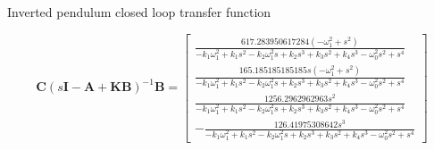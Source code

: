 \documentclass{article}
\begin{document}
Inverted pendulum closed loop transfer function

\begin{equation}
  \mathbf{C} (s\mathbf{I} - \mathbf{A} + \mathbf{KB}) ^{-1} \mathbf{B} = \left[\begin{matrix}\frac{617.283950617284 \left(- \omega_{1}^{2} + s^{2}\right)}{- k_{1} \omega_{1}^{2} + k_{1} s^{2} - k_{2} \omega_{1}^{2} s + k_{2} s^{3} + k_{3} s^{2} + k_{4} s^{3} - \omega_{0}^{2} s^{2} + s^{4}}\\\frac{165.185185185185 s \left(- \omega_{1}^{2} + s^{2}\right)}{- k_{1} \omega_{1}^{2} + k_{1} s^{2} - k_{2} \omega_{1}^{2} s + k_{2} s^{3} + k_{3} s^{2} + k_{4} s^{3} - \omega_{0}^{2} s^{2} + s^{4}}\\\frac{1256.2962962963 s^{2}}{- k_{1} \omega_{1}^{2} + k_{1} s^{2} - k_{2} \omega_{1}^{2} s + k_{2} s^{3} + k_{3} s^{2} + k_{4} s^{3} - \omega_{0}^{2} s^{2} + s^{4}}\\- \frac{126.41975308642 s^{3}}{- k_{1} \omega_{1}^{2} + k_{1} s^{2} - k_{2} \omega_{1}^{2} s + k_{2} s^{3} + k_{3} s^{2} + k_{4} s^{3} - \omega_{0}^{2} s^{2} + s^{4}}\end{matrix}\right]
\end{equation}

\newpage
\begin{thebibliography}{9}

\end{thebibliography}
\end{document}
